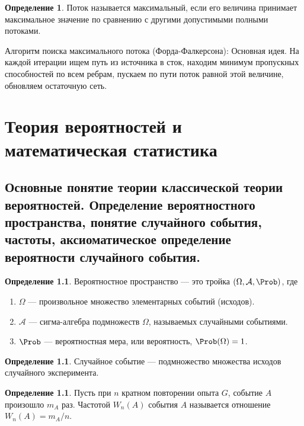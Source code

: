 \documentclass[12pt]{report}
\theoremstyle{definition}
\newtheorem{definition}[theorem]{Определение}
\newcommand{\A}{\mathcal A}
\begin{document}
\begin{definition}
Поток называется максимальный, если его величина принимает максимальное значение по
сравнению с другими допустимыми полными потоками.
\end{definition}

Алгоритм поиска максимального потока (Форда-Фалкерсона):
Основная идея. На каждой итерации ищем путь из источника в сток,
находим минимум пропускных способностей по всем ребрам, пускаем по
пути поток равной этой величине, обновляем остаточную сеть.


\chapter{Теория вероятностей и математическая статистика}

\section
{
  Основные понятие теории классической теории вероятностей.
  Определение вероятностного пространства, понятие случайного события,
  частоты, аксиоматическое определение вероятности случайного события.
}

\begin{definition}
Вероятностное пространство --- это тройка $(\Omega, \A, \Prob)$, где
\begin{enumerate}
\item $\Omega$ --- произвольное множество элементарных событий (исходов).
\item $\A$ --- сигма-алгебра подмножеств $\Omega$, называемых случайными событиями.
\item $\Prob$ --- вероятностная мера, или вероятность, $\Prob(\Omega) = 1$.
\end{enumerate}
\end{definition}

\begin{definition}
Случайное событие --- подмножество множества исходов случайного эксперимента.
\end{definition}

\begin{definition}
Пусть при $n$ кратном повторении опыта $G$, событие $A$ произошло
$m_A$ раз. Частотой $W_n(A)$ события $A$ называется отношение $W_n(A) = m_A / n$.
\end{definition}
\end{document}
